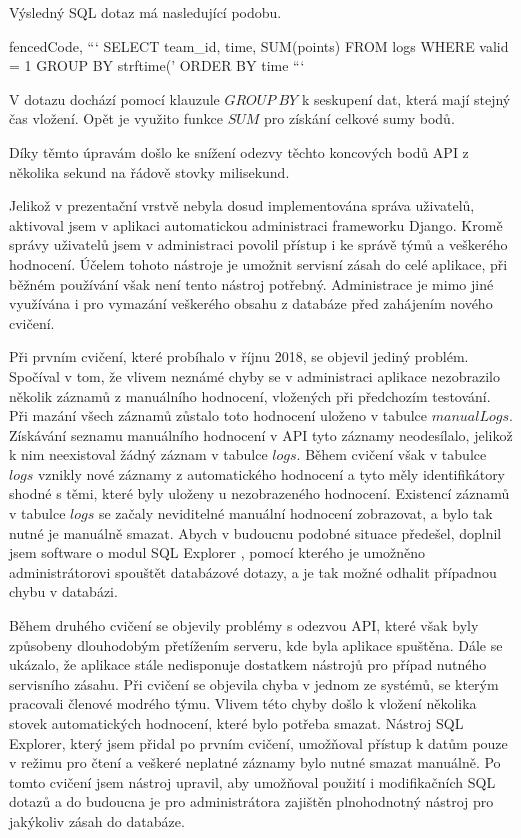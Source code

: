 \documentclass[
  digital,
  twoside,
  table, 
  nolof, 
  nolot
]{fithesis3}
\begin{document}
Výsledný SQL dotaz má nasledující podobu.

\begin{markdown*}{%
  fencedCode,
}
```
SELECT team_id, time, SUM(points) FROM logs 
WHERE valid = 1 
GROUP BY strftime('%
ORDER BY time
```
\end{markdown*}

V dotazu dochází pomocí klauzule $GROUP\ BY$ k seskupení dat, která mají stejný čas vložení. Opět je využito funkce $SUM$ pro získání celkové sumy bodů.

Díky těmto úpravám došlo ke snížení odezvy těchto koncových bodů API z několika sekund na řádově stovky milisekund. 

Jelikož v prezentační vrstvě nebyla dosud implementována správa uživatelů, aktivoval jsem v aplikaci automatickou administraci frameworku Django. Kromě správy uživatelů jsem v administraci povolil přístup i ke správě týmů a veškerého hodnocení. Účelem tohoto nástroje je umožnit servisní zásah do celé aplikace, při běžném používání však není tento nástroj potřebný. Administrace je mimo jiné využívána i pro vymazání veškerého obsahu z databáze před zahájením nového cvičení.

Při prvním cvičení, které probíhalo v říjnu 2018, se objevil jediný problém. Spočíval v tom, že vlivem neznámé chyby se v administraci aplikace nezobrazilo několik záznamů z manuálního hodnocení, vložených při předchozím testování. Při mazání všech záznamů zůstalo toto hodnocení uloženo v tabulce $manualLogs$. Získávání seznamu manuálního hodnocení v API tyto záznamy neodesílalo, jelikož k nim neexistoval žádný záznam v tabulce $logs$. Během cvičení však v tabulce $logs$ vznikly nové záznamy z automatického hodnocení a tyto měly identifikátory shodné s těmi, které byly uloženy u nezobrazeného hodnocení. Existencí záznamů v tabulce $logs$ se začaly neviditelné manuální hodnocení zobrazovat, a bylo tak nutné je manuálně smazat. Abych v budoucnu podobné situace předešel, doplnil jsem software o modul SQL Explorer \cite{sqlexplorer}, pomocí kterého je umožněno administrátorovi spouštět databázové dotazy, a je tak možné odhalit případnou chybu v databázi.

Během druhého cvičení se objevily problémy s odezvou API, které však byly způsobeny dlouhodobým přetížením serveru, kde byla aplikace spuštěna. Dále se ukázalo, že aplikace stále nedisponuje dostatkem nástrojů pro případ nutného servisního zásahu. Při cvičení se objevila chyba v jednom ze systémů, se kterým pracovali členové modrého týmu. Vlivem této chyby došlo k vložení několika stovek automatických hodnocení, které bylo potřeba smazat. Nástroj SQL Explorer, který jsem přidal po prvním cvičení, umožňoval přístup k datům pouze v režimu pro čtení a veškeré neplatné záznamy bylo nutné smazat manuálně. Po tomto cvičení jsem nástroj upravil, aby umožňoval použití i modifikačních SQL dotazů a do budoucna je pro administrátora zajištěn plnohodnotný nástroj pro jakýkoliv zásah do databáze.
\end{document}
